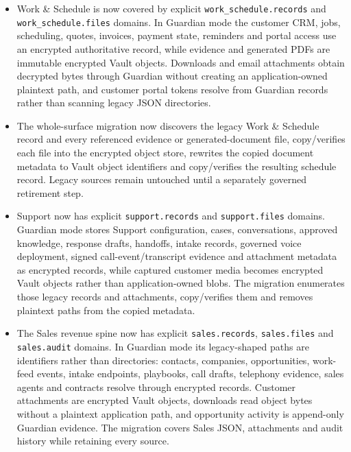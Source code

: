 \documentclass[11pt]{article}
\begin{document}
\begin{itemize}
  \item Work \& Schedule is now covered by explicit \texttt{work\_schedule.records} and \texttt{work\_schedule.files} domains. In Guardian mode the customer CRM, jobs, scheduling, quotes, invoices, payment state, reminders and portal access use an encrypted authoritative record, while evidence and generated PDFs are immutable encrypted Vault objects. Downloads and email attachments obtain decrypted bytes through Guardian without creating an application-owned plaintext path, and customer portal tokens resolve from Guardian records rather than scanning legacy JSON directories.
  \item The whole-surface migration now discovers the legacy Work \& Schedule record and every referenced evidence or generated-document file, copy/verifies each file into the encrypted object store, rewrites the copied document metadata to Vault object identifiers and copy/verifies the resulting schedule record. Legacy sources remain untouched until a separately governed retirement step.
  \item Support now has explicit \texttt{support.records} and \texttt{support.files} domains. Guardian mode stores Support configuration, cases, conversations, approved knowledge, response drafts, handoffs, intake records, governed voice deployment, signed call-event/transcript evidence and attachment metadata as encrypted records, while captured customer media becomes encrypted Vault objects rather than application-owned blobs. The migration enumerates those legacy records and attachments, copy/verifies them and removes plaintext paths from the copied metadata.
  \item The Sales revenue spine now has explicit \texttt{sales.records}, \texttt{sales.files} and \texttt{sales.audit} domains. In Guardian mode its legacy-shaped paths are identifiers rather than directories: contacts, companies, opportunities, work-feed events, intake endpoints, playbooks, call drafts, telephony evidence, sales agents and contracts resolve through encrypted records. Customer attachments are encrypted Vault objects, downloads read object bytes without a plaintext application path, and opportunity activity is append-only Guardian evidence. The migration covers Sales JSON, attachments and audit history while retaining every source.

\end{itemize}
\end{document}
